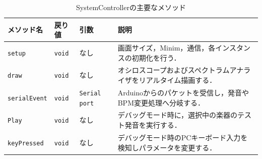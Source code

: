 \documentclass[lualatex,book,paper=a4paper,jafontsize=11.5pt,jafontscale=1.05]{jlreq}
\begin{document}
\begin{table}[H]
    \centering
    \caption{SystemControllerの主要なメソッド}
    \label{table:system_methods}
    \begin{tabular}{|l|l|p{2.8cm}|p{6.8cm}|}
        \hline
        \textbf{メソッド名} & \textbf{戻り値} & \textbf{引数} & \textbf{説明} \\ \hline
        \texttt{setup} & \texttt{void} & なし & 画面サイズ，Minim，通信，各インスタンスの初期化を行う． \\ \hline
        \texttt{draw} & \texttt{void} & なし & オシロスコープおよびスペクトラムアナライザをリアルタイム描画する． \\ \hline
        \texttt{serialEvent} & \texttt{void} & \texttt{Serial port} & Arduinoからのパケットを受信し，発音やBPM変更処理へ分岐する． \\ \hline
        \texttt{Play} & \texttt{void} & なし & デバッグモード時に，選択中の楽器のテスト発音を実行する． \\ \hline
        \texttt{keyPressed} & \texttt{void} & なし & デバッグモード時のPCキーボード入力を検知しパラメータを変更する． \\ \hline
    \end{tabular}
\end{table}
\end{document}
